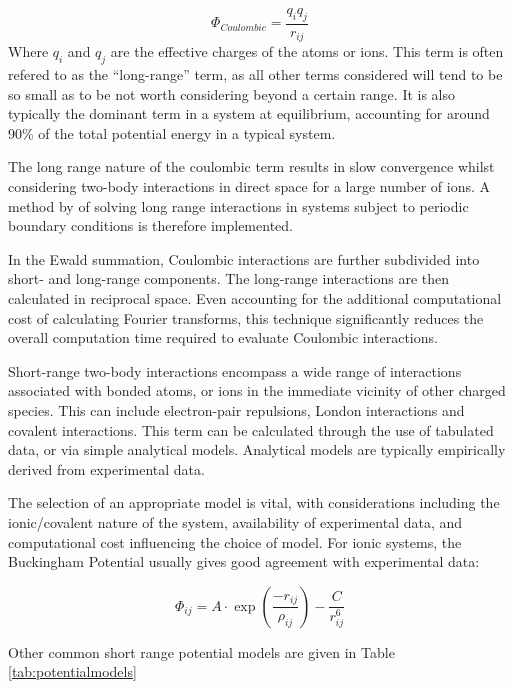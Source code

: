 \begin{equation}
\Phi_{Coulombic} = \frac{q_iq_j}{r_{ij}}
\label{eq:coulombic}
\end{equation}
Where $q_i$ and $q_j$ are the effective charges of the atoms or ions.
This term is often refered to as the ``long-range'' term, as all other terms considered will tend to be so small as to be not worth considering beyond a certain range.
It is also typically the dominant term in a system at equilibrium, accounting for around 90\% of the total potential energy in a typical system.\cite{Catlow2013}

The long range nature of the coulombic term results in slow convergence whilst considering two-body interactions in direct space for a large number of ions.
A method by \citet{Ewald1921} of solving long range interactions in systems subject to periodic boundary conditions is therefore implemented.

In the Ewald summation, Coulombic interactions are further subdivided into short- and long-range components.
The long-range interactions are then calculated in reciprocal space.
Even accounting for the additional computational cost of calculating Fourier transforms, this technique significantly reduces the overall computation time required to evaluate Coulombic interactions.

Short-range two-body interactions encompass a wide range of interactions associated with bonded atoms, or ions in the immediate vicinity of other charged species.
This can include electron-pair repulsions, London interactions and covalent interactions.
This term can be calculated through the use of tabulated data, or via simple analytical models.
Analytical models are typically empirically derived from experimental data.

The selection of an appropriate model is vital, with considerations including the ionic/covalent nature of the system, availability of experimental data, and computational cost influencing the choice of model. For ionic systems, the Buckingham Potential usually gives good agreement with experimental data:


\begin{equation}
\Phi_{ij} = A\cdot \exp \left(\frac{-r_{ij}}{\rho_{ij}} \right) - \frac{C}{r_{ij}^6}
\label{eq:Buckingham}
\end{equation}

Other common short range potential models are given in Table \ref{tab:potentialmodels}

